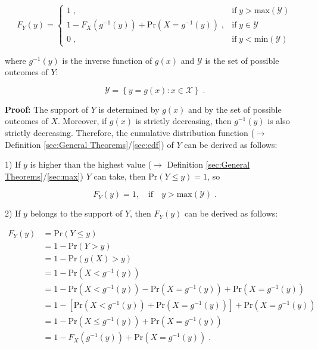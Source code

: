 \documentclass[a4paper,12pt,twoside]{book}
\begin{document}
\begin{equation} \label{eq:cdf-sdfct-cdf-sdfct}
F_Y(y) = \left\{
\begin{array}{rl}
1 \; , & \text{if} \; y > \mathrm{max}(\mathcal{Y}) \\
1 - F_X(g^{-1}(y)) + \mathrm{Pr}(X = g^{-1}(y)) \; , & \text{if} \; y \in \mathcal{Y} \\
0 \; , & \text{if} \; y < \mathrm{min}(\mathcal{Y})
\end{array}
\right.
\end{equation}

where $g^{-1}(y)$ is the inverse function of $g(x)$ and $\mathcal{Y}$ is the set of possible outcomes of $Y$:

\begin{equation} \label{eq:cdf-sdfct-Y-range}
\mathcal{Y} = \left\lbrace y = g(x): x \in \mathcal{X} \right\rbrace \; .
\end{equation}


\vspace{1em}
\textbf{Proof:} The support of $Y$ is determined by $g(x)$ and by the set of possible outcomes of $X$. Moreover, if $g(x)$ is strictly decreasing, then $g^{-1}(y)$ is also strictly decreasing. Therefore, the cumulative distribution function ($\rightarrow$ Definition \ref{sec:General Theorems}/\ref{sec:cdf}) of $Y$ can be derived as follows:

1) If $y$ is higher than the highest value ($\rightarrow$ Definition \ref{sec:General Theorems}/\ref{sec:max}) $Y$ can take, then $\mathrm{Pr}(Y \leq y) = 1$, so

\begin{equation} \label{eq:cdf-sdfct-cdf-sdfct-p1}
F_Y(y) = 1, \quad \text{if} \quad y > \mathrm{max}(\mathcal{Y}) \; .
\end{equation}

2) If $y$ belongs to the support of $Y$, then $F_Y(y)$ can be derived as follows:

\begin{equation} \label{eq:cdf-sdfct-cdf-sdfct-p2}
\begin{split}
F_Y(y) &= \mathrm{Pr}(Y \leq y) \\
&= 1 - \mathrm{Pr}(Y > y) \\
&= 1 - \mathrm{Pr}(g(X) > y) \\
&= 1 - \mathrm{Pr}(X < g^{-1}(y)) \\
&= 1 - \mathrm{Pr}(X < g^{-1}(y)) - \mathrm{Pr}(X = g^{-1}(y)) + \mathrm{Pr}(X = g^{-1}(y)) \\
&= 1 - \left[ \mathrm{Pr}(X < g^{-1}(y)) + \mathrm{Pr}(X = g^{-1}(y)) \right] + \mathrm{Pr}(X = g^{-1}(y)) \\
&= 1 - \mathrm{Pr}(X \leq g^{-1}(y)) + \mathrm{Pr}(X = g^{-1}(y)) \\
&= 1 - F_X(g^{-1}(y)) + \mathrm{Pr}(X = g^{-1}(y)) \; .
\end{split}
\end{equation}
\end{document}
